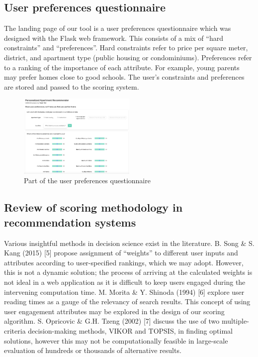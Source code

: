 \documentclass[a4paper, 11pt]{article}
\begin{document}
    \subsection{User preferences questionnaire}
    
    The landing page of our tool is a user preferences questionnaire which was designed with the Flask web framework. This consists of a mix of “hard constraints” and “preferences”. Hard constraints refer to price per square meter, district, and apartment type (public housing or condominiums). Preferences refer to a ranking of the importance of each attribute. For example, young parents may prefer homes close to good schools. The user's constraints and preferences are stored and passed to the scoring system.
    
   \begin{figure}[h]
   \centering
   \includegraphics[width={0.5\textwidth}]{questionnaire.png}
   \caption{Part of the user preferences questionnaire}
   \end{figure}
    
    \subsection{Review of scoring methodology in recommendation systems} 
    Various insightful methods in decision science exist in the literature. B. Song \& S. Kang (2015) [5] propose assignment of “weights” to different user inputs and attributes according to user-specified rankings, which we may adopt. However, this is not a dynamic solution; the process of arriving at the calculated weights is not ideal in a web application as it is difficult to keep users engaged during the intervening computation time. M. Morita \& Y. Shinoda (1994) [6] explore user reading times as a gauge of the relevancy of search results. This concept of using user engagement attributes may be explored in the design of our scoring algorithm. S. Opricovic \& G.H. Tzeng (2002) [7] discuss the use of two multiple-criteria decision-making methods, VIKOR and TOPSIS, in finding optimal solutions, however this may not be computationally feasible in large-scale evaluation of hundreds or thousands of alternative results. 
    
\end{document}
